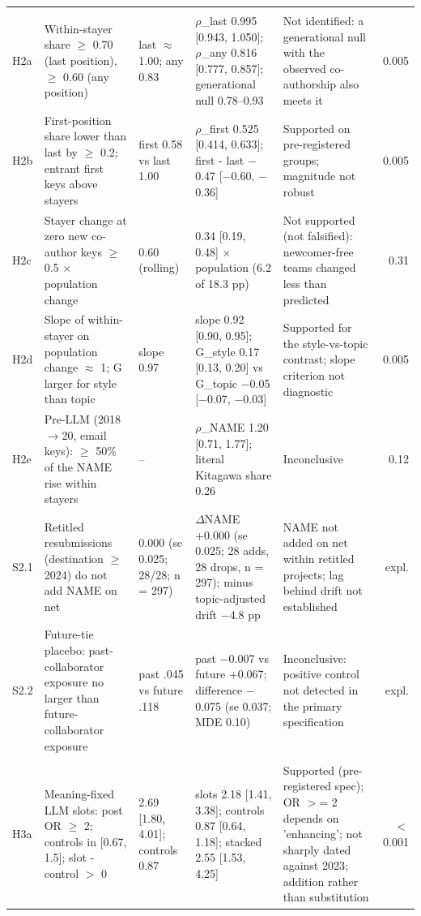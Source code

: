 {\begin{longtable}{l p{2.5cm} p{2.2cm} p{3.9cm} p{3.2cm} r}
\addlinespace
\multicolumn{6}{l}{\textit{D2 Who carries the change (declared profile keys)}} \\
H2a & Within-stayer share $\geq$ 0.70 (last position), $\geq$ 0.60 (any position) & last $\approx$ 1.00; any 0.83 & $\rho$\_last 0.995 [0.943, 1.050]; $\rho$\_any 0.816 [0.777, 0.857]; generational null 0.78--0.93 & Not identified: a generational null with the observed co-authorship also meets it & 0.005 \\
H2b & First-position share lower than last by $\geq$ 0.2; entrant first keys above stayers & first 0.58 vs last 1.00 & $\rho$\_first 0.525 [0.414, 0.633]; first - last $-$0.47 [$-$0.60, $-$0.36] & Supported on pre-registered groups; magnitude not robust & 0.005 \\
H2c & Stayer change at zero new co-author keys $\geq$ 0.5 $\times$ population change & 0.60 (rolling) & 0.34 [0.19, 0.48] $\times$ population (6.2 of 18.3 pp) & Not supported (not falsified): newcomer-free teams changed less than predicted & 0.31 \\
H2d & Slope of within-stayer on population change $\approx$ 1; G larger for style than topic & slope 0.97 & slope 0.92 [0.90, 0.95]; G\_style 0.17 [0.13, 0.20] vs G\_topic $-$0.05 [$-$0.07, $-$0.03] & Supported for the style-vs-topic contrast; slope criterion not diagnostic & 0.005 \\
H2e & Pre-LLM (2018$\rightarrow$20, email keys): $\geq$ 50\% of the NAME rise within stayers & -- & $\rho$\_NAME 1.20 [0.71, 1.77]; literal Kitagawa share 0.26 & Inconclusive & 0.12 \\
S2.1 & Retitled resubmissions (destination $\geq$ 2024) do not add NAME on net & 0.000 (se 0.025; 28/28; n = 297) & $\Delta$NAME +0.000 (se 0.025; 28 adds, 28 drops, n = 297); minus topic-adjusted drift $-$4.8 pp & NAME not added on net within retitled projects; lag behind drift not established & expl. \\
S2.2 & Future-tie placebo: past-collaborator exposure no larger than future-collaborator exposure & past .045 vs future .118 & past $-$0.007 vs future +0.067; difference $-$0.075 (se 0.037; MDE 0.10) & Inconclusive: positive control not detected in the primary specification & expl. \\
\addlinespace
\multicolumn{6}{l}{\textit{D3 The machine register}} \\
H3a & Meaning-fixed LLM slots: post OR $\geq$ 2; controls in [0.67, 1.5]; slot - control $>$ 0 & 2.69 [1.80, 4.01]; controls 0.87 & slots 2.18 [1.41, 3.38]; controls 0.87 [0.64, 1.18]; stacked 2.55 [1.53, 4.25] & Supported (pre-registered spec); OR $>$= 2 depends on 'enhancing'; not sharply dated against 2023; addition rather than substitution & $<$0.001 \\

\end{longtable}}
